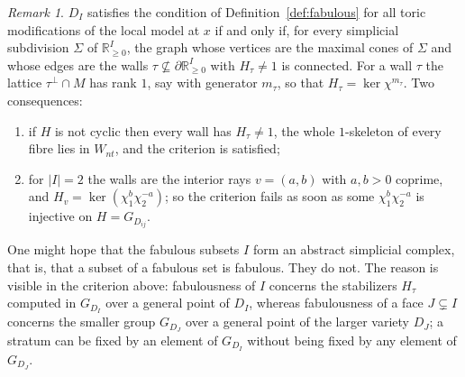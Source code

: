 \documentclass[11pt]{amsart}
\theoremstyle{plain}
\theoremstyle{definition}
\theoremstyle{remark}
\newtheorem{remark}[theorem]{Remark}
\numberwithin{equation}{section}
\begin{document}
\begin{remark} \label{rem:toric_criterion}
$D_I$ satisfies the condition of Definition~\ref{def:fabulous} for all
toric modifications of the local model at $x$ if and only if, for every
simplicial subdivision $\Sigma$ of $\mathbb{R}^I_{\geq 0}$, the graph whose
vertices are the maximal cones of $\Sigma$ and whose edges are the walls
$\tau \not\subseteq \partial \mathbb{R}^I_{\geq 0}$ with $H_\tau \neq 1$ is
connected.  For a wall $\tau$ the lattice $\tau^\perp \cap M$ has rank $1$,
say with generator $m_\tau$, so that $H_\tau = \ker \chi^{m_\tau}$.  Two
consequences:
\begin{enumerate}
\item if $H$ is not cyclic then every wall has $H_\tau \neq 1$, the whole
$1$-skeleton of every fibre lies in $W_{nt}$, and the criterion is
satisfied;
\item for $|I| = 2$ the walls are the interior rays $v = (a,b)$ with
$a,b > 0$ coprime, and $H_v = \ker(\chi_1^{b}\chi_2^{-a})$; so the
criterion fails as soon as some $\chi_1^b \chi_2^{-a}$ is injective on
$H = G_{D_{ij}}$.
\end{enumerate}
\end{remark}

One might hope that the fabulous subsets $I$ form an abstract simplicial
complex, that is, that a subset of a fabulous set is fabulous.  They do
not.  The reason is visible in the criterion above: fabulousness of $I$
concerns the stabilizers $H_\tau$ computed in $G_{D_I}$ over a general
point of $D_I$, whereas fabulousness of a face $J \subsetneq I$ concerns
the smaller group $G_{D_J}$ over a general point of the larger variety
$D_J$; a stratum can be fixed by an element of $G_{D_I}$ without being
fixed by any element of $G_{D_J}$.
\end{document}
